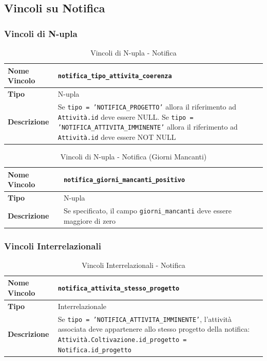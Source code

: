 \documentclass[12pt,a4paper]{article}
\begin{document}
\subsection{Vincoli su Notifica}

\subsubsection{Vincoli di N-upla}

\begin{table}[H]
\centering
\caption{Vincoli di N-upla - Notifica}
\begin{tabularx}{\textwidth}{|l|X|}
\hline
\textbf{Nome Vincolo} & \texttt{notifica\_tipo\_attivita\_coerenza} \\
\hline
\textbf{Tipo} & N-upla \\
\hline
\textbf{Descrizione} & Se \texttt{tipo = 'NOTIFICA\_PROGETTO'} allora il riferimento ad \texttt{Attività.id} deve essere NULL. Se \texttt{tipo = 'NOTIFICA\_ATTIVITA\_IMMINENTE'} allora il riferimento ad \texttt{Attività.id} deve essere NOT NULL \\
\hline
\end{tabularx}
\end{table}

\begin{table}[H]
\centering
\caption{Vincoli di N-upla - Notifica (Giorni Mancanti)}
\begin{tabularx}{\textwidth}{|l|X|}
\hline
\textbf{Nome Vincolo} & \texttt{notifica\_giorni\_mancanti\_positivo} \\
\hline
\textbf{Tipo} & N-upla \\
\hline
\textbf{Descrizione} & Se specificato, il campo \texttt{giorni\_mancanti} deve essere maggiore di zero \\
\hline
\end{tabularx}
\end{table}

\subsubsection{Vincoli Interrelazionali}

\begin{table}[H]
\centering
\caption{Vincoli Interrelazionali - Notifica}
\begin{tabularx}{\textwidth}{|l|X|}
\hline
\textbf{Nome Vincolo} & \texttt{notifica\_attivita\_stesso\_progetto} \\
\hline
\textbf{Tipo} & Interrelazionale \\
\hline
\textbf{Descrizione} & Se \texttt{tipo = 'NOTIFICA\_ATTIVITA\_IMMINENTE'}, l'attività associata deve appartenere allo stesso progetto della notifica: \texttt{Attività.Coltivazione.id\_progetto = Notifica.id\_progetto} \\
\hline
\end{tabularx}
\end{table}
\end{document}
